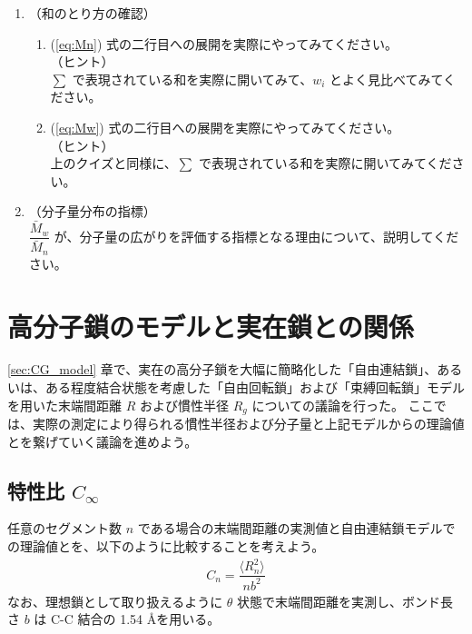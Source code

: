 \documentclass[uplatex,dvipdfmx,a4paper,11pt, titlepage]{jsarticle}
\begin{document}
	\begin{enumerate}
	\item
	（和のとり方の確認）\\
		\vspace{-5mm}
		\begin{enumerate}
		\item
		\label{it:4-1}
		(\ref{eq:Mn}) 式の二行目への展開を実際にやってみてください。\\
		（ヒント）\\
		$\sum$ で表現されている和を実際に開いてみて、$w_i$ とよく見比べてみてください。

		\item
		\label{it:4-2}
		(\ref{eq:Mw}) 式の二行目への展開を実際にやってみてください。\\
		（ヒント）\\
		上のクイズと同様に、$\sum$ で表現されている和を実際に開いてみてください。
		\end{enumerate}
	\item
	（分子量分布の指標）\\
	\label{it:4-3}
	$\dfrac{\bar{M}_w}{\bar{M}_n}$ が、分子量の広がりを評価する指標となる理由について、説明してください。

	\end{enumerate}

\newpage

\section{高分子鎖のモデルと実在鎖との関係}

\ref{sec:CG_model} 章で、実在の高分子鎖を大幅に簡略化した「自由連結鎖」、あるいは、ある程度結合状態を考慮した「自由回転鎖」および「束縛回転鎖」モデルを用いた末端間距離 $R$ および慣性半径 $R_g$ についての議論を行った。
ここでは、実際の測定により得られる慣性半径および分子量と上記モデルからの理論値とを繋げていく議論を進めよう。


\subsection{特性比 $C_{\infty}$}

任意のセグメント数 $n$ である場合の末端間距離の実測値と自由連結鎖モデルでの理論値とを、以下のように比較することを考えよう。
\begin{align}
C_n=\dfrac{ \langle R_n^2 \rangle }{n b^2}
\end{align}
なお、理想鎖として取り扱えるように $\theta$ 状態で末端間距離を実測し、ボンド長さ $b$ は C-C 結合の 1.54 \AA を用いる。
\end{document}
